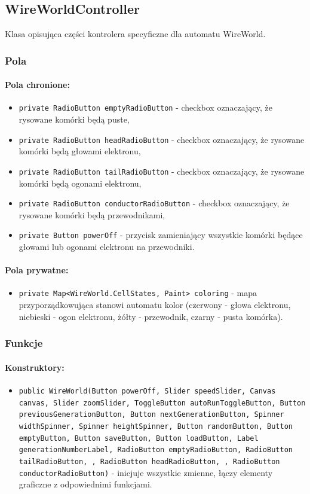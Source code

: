 \documentclass{report}
\begin{document}
\subsection{WireWorldController}
Klasa opisująca części kontrolera specyficzne dla automatu WireWorld.
\subsubsection{Pola}
\paragraph{Pola chronione:}
\begin{itemize}	\label{sec:checkbox}
	\item \texttt{private RadioButton emptyRadioButton} - checkbox oznaczający, że rysowane komórki będą puste,
	\item \texttt{private RadioButton headRadioButton} - checkbox oznaczający, że rysowane komórki będą głowami elektronu,
	\item \texttt{private RadioButton tailRadioButton} - checkbox oznaczający, że rysowane komórki będą ogonami elektronu,
	\item \texttt{private RadioButton conductorRadioButton} - checkbox oznaczający, że rysowane komórki będą przewodnikami,
	\item \texttt{private Button powerOff} - przycisk zamieniający wszystkie komórki będące głowami lub ogonami elektronu na przewodniki.
\end{itemize}

\paragraph{Pola prywatne:}
\begin{itemize}
	\item \texttt{private Map<WireWorld.CellStates, Paint> coloring} - mapa przyporządkowująca stanowi automatu kolor (czerwony - głowa elektronu, niebieski - ogon elektronu, żółty - przewodnik, czarny - pusta komórka).
\end{itemize}
\subsubsection{Funkcje}
\paragraph{Konstruktory:}
\begin{itemize}
\item \texttt{public WireWorld(Button powerOff, Slider speedSlider, Canvas canvas, Slider zoomSlider, ToggleButton autoRunToggleButton, Button previousGenerationButton, Button nextGenerationButton, Spinner widthSpinner, Spinner heightSpinner, Button randomButton, Button emptyButton, Button saveButton, Button loadButton, Label generationNumberLabel, RadioButton emptyRadioButton, RadioButton tailRadioButton, , RadioButton headRadioButton, , RadioButton conductorRadioButton)} - inicjuje wszystkie zmienne, łączy elementy graficzne z odpowiednimi funkcjami.
\end{itemize}
\end{document}
